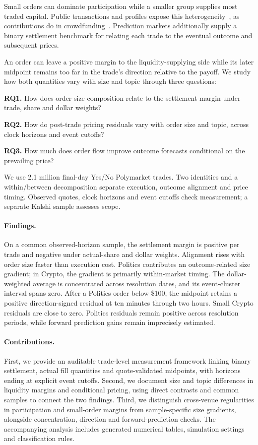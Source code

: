 \documentclass[sigconf,anonymous,nonacm,balance=false]{acmart}
\begin{document}
Small orders can dominate participation while a smaller group supplies most traded capital. Public transactions and profiles expose this heterogeneity~\cite{soska2021derivatives,kawai2023neighbor}, as contributions do in crowdfunding~\cite{horvat2023hidden}. Prediction markets additionally supply a binary settlement benchmark for relating each trade to the eventual outcome and subsequent prices.

An order can leave a positive margin to the liquidity-supplying side while its later midpoint remains too far in the trade's direction relative to the payoff. We study how both quantities vary with size and topic through three questions:

\noindent\textbf{RQ1.} How does order-size composition relate to the settlement margin under trade, share and dollar weights?

\noindent\textbf{RQ2.} How do post-trade pricing residuals vary with order size and topic, across clock horizons and event cutoffs?

\noindent\textbf{RQ3.} How much does order flow improve outcome forecasts conditional on the prevailing price?

We use 2.1 million final-day Yes/No Polymarket trades. Two identities and a within/between decomposition separate execution, outcome alignment and price timing. Observed quotes, clock horizons and event cutoffs check measurement; a separate Kalshi sample assesses scope.

\paragraph{Findings.}
On a common observed-horizon sample, the settlement margin is positive per trade and negative under actual-share and dollar weights. Alignment rises with order size faster than execution cost. Politics contributes an outcome-related size gradient; in Crypto, the gradient is primarily within-market timing. The dollar-weighted average is concentrated across resolution dates, and its event-cluster interval spans zero. After a Politics order below \$100, the midpoint retains a positive direction-signed residual at ten minutes through two hours. Small Crypto residuals are close to zero. Politics residuals remain positive across resolution periods, while forward prediction gains remain imprecisely estimated.

\paragraph{Contributions.}
First, we provide an auditable trade-level measurement framework linking binary settlement, actual fill quantities and quote-validated midpoints, with horizons ending at explicit event cutoffs. Second, we document size and topic differences in liquidity margins and conditional pricing, using direct contrasts and common samples to connect the two findings. Third, we distinguish cross-venue regularities in participation and small-order margins from sample-specific size gradients, alongside concentration, direction and forward-prediction checks. The accompanying analysis includes generated numerical tables, simulation settings and classification rules.
\end{document}

